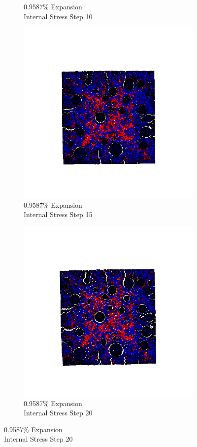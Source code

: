 \begin{figure}[ht!]
\begin{subfigure}{.25\textwidth}
      \caption{0.9587\% Expansion\\Internal Stress Step 10}
    \end{subfigure}%
    \begin{subfigure}{.25\textwidth}
      \centering
      \includegraphics[width=1.0\linewidth]{Files/exp_3D/DEF/A15X0C_4_s15.png}
      \caption{0.9587\% Expansion\\Internal Stress Step 15}
    \end{subfigure}%
    \begin{subfigure}{.25\textwidth}
      \centering
      \includegraphics[width=1.0\linewidth]{Files/exp_3D/DEF/A15X0C_4_stress.png}
      \caption{0.9587\% Expansion\\Internal Stress Step 20}
    \end{subfigure}


\end{figure}
